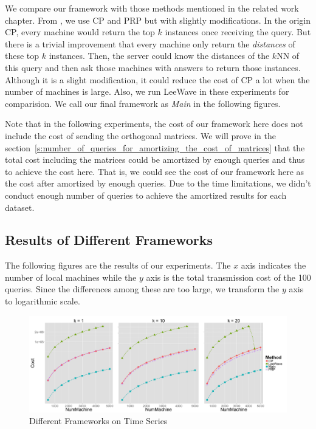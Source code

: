 We compare our framework with those methods mentioned in the related work chapter.  From \cite{PRP}, we use CP and PRP but with slightly modifications. In the origin CP, every machine would return the top $k$ instances once receiving the query.  But there is a trivial improvement that every machine only return the \emph{distances} of these top $k$ instances.  Then, the server could know the distances of the $k$NN of this query and then ask those machines with answers to return those instances.  Although it is a slight modification, it could reduce the cost of CP a lot when the number of machines is large.  Also, we run LeeWave \cite{LeeWave} in these experiments for comparision.  We call our final framework as \emph{Main} in the following figures.


Note that in the following experiments, the cost of our framework here does not include the cost of sending the orthogonal matrices.  We will prove in the section~\ref{s:number_of_queries_for_amortizing_the_cost_of_matrices} that the total cost including the matrices could be amortized by enough queries and thus to achieve the cost here.  That is, we could see the cost of our framework here as the cost after amortized by enough queries.  Due to the time limitations, we didn't conduct enough number of queries to achieve the amortized results for each dataset.



\subsection{Results of Different Frameworks} %
\label{sub:results_of_different_fra}

The following figures are the results of our experiments.  The $x$ axis indicates the number of local machines while the $y$ axis is the total transmission cost of the 100 queries.  Since the differences among these are too large, we transform the $y$ axis to logarithmic scale.  

\begin{figure}[htpb!]
  \centering
  \includegraphics[width=1.0\linewidth]{exp/out/time.png}
  \caption{Different Frameworks on Time Series}
  \label{fig:out_time}
\end{figure}

